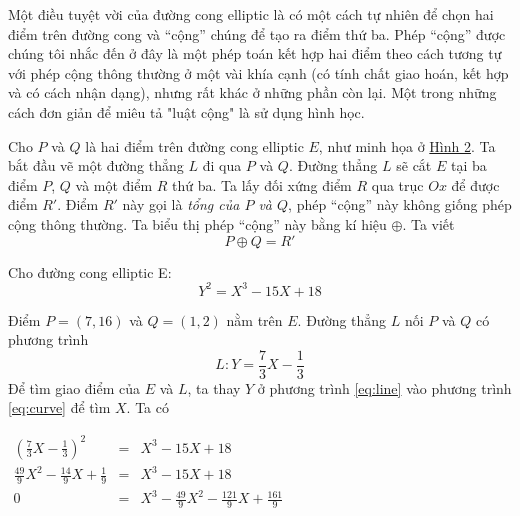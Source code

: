 Một điều tuyệt vời của đường cong elliptic là có một cách tự nhiên để chọn hai điểm trên đường cong và
``cộng'' chúng để tạo ra điểm thứ ba. Phép ``cộng'' được chúng tôi nhắc đến ở đây là một phép toán kết hợp hai điểm theo cách tương tự với phép cộng thông thường
ở một vài khía cạnh (có tính chất giao hoán, kết hợp và có cách nhận dạng), nhưng rất khác ở những phần còn lại. Một trong những cách đơn giản để miêu tả "luật cộng" là sử dụng hình học.

Cho $P$ và $Q$ là hai điểm trên đường cong elliptic $E$, như minh họa ở \hyperref[fg:fg2]{Hình 2}. Ta bắt đầu vẽ một đường thẳng $L$ đi qua $P$ và $Q$. Đường thẳng
$L$ sẽ cắt $E$ tại ba điểm $P$, $Q$ và một điểm $R$ thứ ba. Ta lấy đối xứng điểm $R$ qua trục $Ox$ để được điểm $R'$. Điểm $R'$ này gọi là \textit{tổng của $P$ và $Q$},
phép ``cộng'' này không giống phép cộng thông thường. Ta biểu thị phép ``cộng'' này bằng kí hiệu $\oplus$. Ta viết
\begin{equation}
	P \oplus Q = R'
\end{equation}

\begin{example}
	\label{ex:ex1}
	Cho đường cong elliptic E:
	\begin{equation}
		\label{eq:curve}
		Y^2 = X^3 -15X + 18
	\end{equation}
\end{example}
Điểm $P = (7,16)$ và $Q = (1,2)$ nằm trên $E$. Đường thẳng $L$ nối $P$ và $Q$ có phương trình
\begin{equation}
	\label{eq:line}
	L: Y = \frac{7}{3}X - \frac{1}{3}
\end{equation}
Để tìm giao điểm của $E$ và $L$, ta thay $Y$ ở phương trình \eqref{eq:line} vào phương trình \eqref{eq:curve} để tìm $X$. Ta có
\begin{center}

	$
		\begin{array}{rcl}
			(\frac{7}{3}X - \frac{1}{3})^2                & = & X^3 -15X+18                                        \\
			\frac{49}{9}X^2 - \frac{14}{9}X + \frac{1}{9} & = & X^3 -15X+18                                        \\
			0                                             & = & X^3 -\frac{49}{9}X^2 -\frac{121}{9}X+\frac{161}{9} \\
		\end{array}
	$
\end{center}

